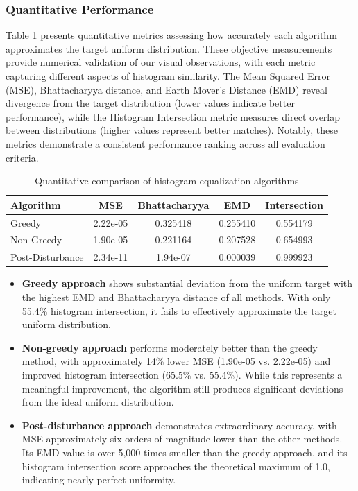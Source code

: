 \documentclass[12pt,a4paper]{article}
\begin{document}
\subsubsection{Quantitative Performance}

Table \ref{tab:eq_metrics} presents quantitative metrics assessing how accurately each algorithm approximates the target uniform distribution. These objective measurements provide numerical validation of our visual observations, with each metric capturing different aspects of histogram similarity. The Mean Squared Error (MSE), Bhattacharyya distance, and Earth Mover's Distance (EMD) reveal divergence from the target distribution (lower values indicate better performance), while the Histogram Intersection metric measures direct overlap between distributions (higher values represent better matches). Notably, these metrics demonstrate a consistent performance ranking across all evaluation criteria.
\begin{table}[htbp]
    \centering
    \begin{tabular}{lcccc}
        \toprule
        \textbf{Algorithm} & \textbf{MSE} & \textbf{Bhattacharyya} & \textbf{EMD} & \textbf{Intersection} \\
        \midrule
        Greedy & 2.22e-05 & 0.325418 & 0.255410 & 0.554179 \\
        Non-Greedy & 1.90e-05 & 0.221164 & 0.207528 & 0.654993 \\
        Post-Disturbance & 2.34e-11 & 1.94e-07 & 0.000039 & 0.999923 \\
        \bottomrule
    \end{tabular}
    \caption{Quantitative comparison of histogram equalization algorithms}
    \label{tab:eq_metrics}
\end{table} 



\begin{itemize}
    \item \textbf{Greedy approach} shows substantial deviation from the uniform target with the highest EMD and Bhattacharyya distance of all methods. With only 55.4\% histogram intersection, it fails to effectively approximate the target uniform distribution.
    
    \item \textbf{Non-greedy approach} performs moderately better than the greedy method, with approximately 14\% lower MSE (1.90e-05 vs. 2.22e-05) and improved histogram intersection (65.5\% vs. 55.4\%). While this represents a meaningful improvement, the algorithm still produces significant deviations from the ideal uniform distribution.
    
    \item \textbf{Post-disturbance approach} demonstrates extraordinary accuracy, with MSE approximately six orders of magnitude lower than the other methods. Its EMD value is over 5,000 times smaller than the greedy approach, and its histogram intersection score approaches the theoretical maximum of 1.0, indicating nearly perfect uniformity.
\end{itemize}
\end{document}
